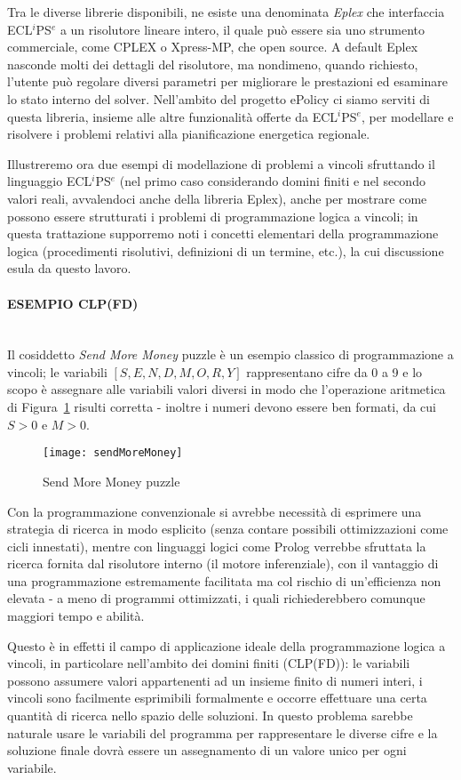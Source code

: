 \documentclass[12pt,a4paper,openright,twoside]{report}
\newcommand{\myparagraph}[1]{\paragraph{#1}\mbox{}\\}
\begin{document}
Tra le diverse librerie disponibili, ne esiste una denominata \emph{Eplex} \cite{eplex} che interfaccia ECL$^i$PS$^e$ a un risolutore lineare intero, il quale può essere sia uno strumento commerciale, come CPLEX o Xpress-MP, che open source. A default Eplex nasconde molti dei dettagli del risolutore, ma nondimeno, quando richiesto, l'utente può regolare diversi parametri per migliorare le prestazioni ed esaminare lo stato interno del solver. Nell'ambito del progetto ePolicy ci siamo serviti di questa libreria, insieme alle altre funzionalità offerte da ECL$^i$PS$^e$, per modellare e risolvere i problemi relativi alla pianificazione energetica regionale.

Illustreremo ora due esempi di modellazione di problemi a vincoli sfruttando il linguaggio ECL$^i$PS$^e$ (nel primo caso considerando domini finiti e nel secondo valori reali, avvalendoci anche della libreria Eplex), anche per mostrare come possono essere strutturati i problemi di programmazione logica a vincoli; in questa trattazione supporremo noti i concetti elementari della programmazione logica (procedimenti risolutivi, definizioni di un termine, etc.), la cui discussione esula da questo lavoro.

\myparagraph{ESEMPIO CLP(FD)}
Il cosiddetto \emph{Send More Money} puzzle è un esempio classico di programmazione a vincoli; le variabili $[S,E,N,D,M,O,R,Y]$ rappresentano cifre da 0 a 9 e lo scopo è assegnare alle variabili valori diversi in modo che l'operazione aritmetica di Figura~\ref{SendMoreMoney} risulti corretta - inoltre i numeri devono essere ben formati, da cui $S>0$ e $M>0$. 

\begin{figure}[h]
	\centering
	\texttt{[image: sendMoreMoney]}
	\caption{Send More Money puzzle}
	\label{SendMoreMoney}
\end{figure}

Con la programmazione convenzionale si avrebbe necessità di esprimere una strategia di ricerca in modo esplicito (senza contare possibili ottimizzazioni come cicli innestati), mentre con linguaggi logici come Prolog verrebbe sfruttata la ricerca fornita dal risolutore interno (il motore inferenziale), con il vantaggio di una programmazione estremamente facilitata ma col rischio di un'efficienza non elevata - a meno di programmi ottimizzati, i quali richiederebbero comunque maggiori tempo e abilità. 

Questo è in effetti il campo di applicazione ideale della programmazione logica a vincoli, in particolare nell'ambito  dei domini finiti (CLP(FD)): le variabili possono assumere valori appartenenti ad un insieme finito di numeri interi, i vincoli sono facilmente esprimibili formalmente e occorre effettuare una certa quantità di ricerca nello spazio delle soluzioni. In questo problema sarebbe naturale usare le variabili del programma per rappresentare le diverse cifre e la soluzione finale dovrà essere un assegnamento di un valore unico per ogni variabile. 
\end{document}
